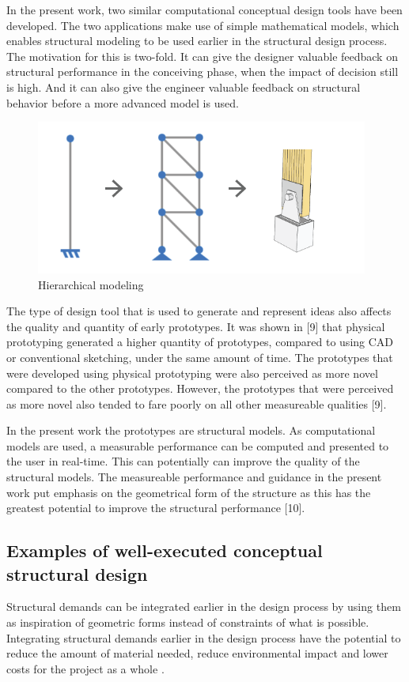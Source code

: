 In the present work, two similar computational conceptual design tools have been developed. The two applications make use of simple mathematical models, which enables structural modeling to be used earlier in the structural design process. The motivation for this is two-fold. It can give the designer valuable feedback on structural performance in the conceiving phase, when the impact of decision still is high. And it can also give the engineer valuable feedback on structural behavior before a more advanced model is used. 

\begin{figure}
  \includegraphics[width=310pt]{graphics/hiarchical-modelling.png}
  \caption{Hierarchical modeling}
  \label{fig:hiarchical-modelling}
\end{figure}

The type of design tool that is used to generate and represent ideas also affects the quality and quantity of early prototypes. It was shown in [9] that physical prototyping generated a higher quantity of prototypes, compared to using CAD or conventional sketching, under the same amount of time. The prototypes that were developed using physical prototyping were also perceived as more novel compared to the other prototypes. However, the prototypes that were perceived as more novel also tended to fare poorly on all other measureable qualities [9]. 

In the present work the prototypes are structural models. As computational models are used, a measurable performance can be computed and presented to the user in real-time. This can potentially can improve the quality of the structural models. The measureable performance and guidance in the present work put emphasis on the geometrical form of the structure as this has the greatest potential to improve the structural performance [10]. 

\subsection{Examples of well-executed conceptual structural design}
Structural demands can be integrated earlier in the design process by using them as inspiration of geometric forms instead of constraints of what is possible. Integrating structural demands earlier in the design process have the potential to reduce the amount of material needed, reduce environmental impact and lower costs for the project as a whole \cite{Mueller2014}. 

